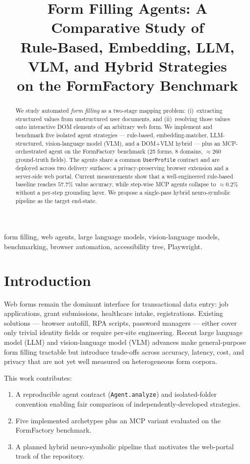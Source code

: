 \documentclass[conference]{IEEEtran}
\title{Form Filling Agents: A Comparative Study of\\
Rule-Based, Embedding, LLM, VLM, and Hybrid Strategies\\
on the FormFactory Benchmark}
\author{
  \IEEEauthorblockN{Yash Sarang}
  \IEEEauthorblockA{Independent Research \\
  Form Filling Agents Project \\
  \texttt{github.com/...}}
}
\begin{document}
\maketitle

\begin{abstract}
We study automated \emph{form filling} as a two-stage mapping problem:
(i)~extracting structured values from unstructured user documents, and
(ii)~resolving those values onto interactive DOM elements of an arbitrary
web form. We implement and benchmark five isolated agent strategies ---
rule-based, embedding-matcher, LLM-structured, vision-language model
(VLM), and a DOM+VLM hybrid --- plus an MCP-orchestrated agent on the
FormFactory benchmark (25 forms, 8 domains, $\approx 260$ ground-truth
fields). The agents share a common \texttt{UserProfile} contract and are
deployed across two delivery surfaces: a privacy-preserving browser
extension and a server-side web portal. Current measurements show that a
well-engineered rule-based baseline reaches $57.7\%$ value accuracy,
while step-wise MCP agents collapse to $\approx 0.2\%$ without a
per-step grounding layer. We propose a single-pass hybrid
neuro-symbolic pipeline as the target end-state.
\end{abstract}

\begin{IEEEkeywords}
form filling, web agents, large language models, vision-language models,
benchmarking, browser automation, accessibility tree, Playwright.
\end{IEEEkeywords}

\section{Introduction}
Web forms remain the dominant interface for transactional data entry:
job applications, grant submissions, healthcare intake, registrations.
Existing solutions --- browser autofill, RPA scripts, password managers
--- either cover only trivial identity fields or require per-site
engineering. Recent large language model (LLM) and vision-language model
(VLM) advances make general-purpose form filling tractable but introduce
trade-offs across accuracy, latency, cost, and privacy that are not yet
well measured on heterogeneous form corpora.

This work contributes:
\begin{enumerate}
  \item A reproducible agent contract (\texttt{Agent.analyze}) and
        isolated-folder convention enabling fair comparison of
        independently-developed strategies.
  \item Five implemented archetypes plus an MCP variant evaluated on
        the FormFactory benchmark.
  \item A planned hybrid neuro-symbolic pipeline that motivates the
        web-portal track of the repository.
\end{enumerate}
\end{document}
